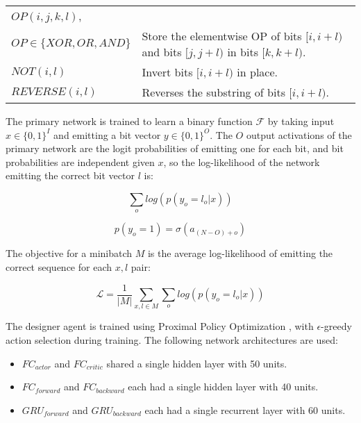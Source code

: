 \documentclass{article}[12px]
\begin{document}
\begin{center}
  \begin{tabular}{| p{4cm} | p{6cm} |}
    \hline
    \(OP(i, j, k, l)\), & \\ \(OP\in\{XOR, OR, AND\}\) & Store the elementwise OP of bits \([i, i + l)\) and bits \([j, j + l)\) in bits \([k, k + l)\). \\
    \(NOT(i, l)\) & Invert bits \([i, i + l)\) in place. \\
    \(REVERSE(i, l)\) & Reverses the substring of bits \([i, i + l)\). \\
    \hline
  \end{tabular}
\end{center}

The primary network is trained to learn a binary function \(\mathcal{F}\) by taking input \(x \in \{0, 1\}^I\) and emitting a bit vector \(y \in \{0, 1\}^O\). The \(O\) output activations of the primary network are the logit probabilities of emitting one for each bit, and bit probabilities are independent given \(x\), so the log-likelihood of the network emitting the correct bit vector \(l\) is:

\begin{equation}
  \sum_o log(p(y_o = l_o | x))
\end{equation}

\begin{equation}
  p(y_o = 1) = \sigma(a_{(N - O) + o})
\end{equation}

The objective for a minibatch \(M\) is the average log-likelihood of emitting the correct sequence for each \(x, l\) pair:

\begin{equation}
  \mathcal{L} = \frac{1}{|M|} \sum_{x, l \in M}\sum_o log(p(y_o = l_o | x))
\end{equation}

The designer agent is trained using Proximal Policy Optimization \cite{DBLP:journals/corr/SchulmanWDRK17}, with \(\epsilon\)-greedy action selection during training. The following network architectures are used:

\begin{itemize}
  \item{\(FC_{actor}\) and \(FC_{critic}\) shared a single hidden layer with 50 units.}
  \item{\(FC_{forward}\) and \(FC_{backward}\) each had a single hidden layer with 40 units.}
  \item{\(GRU_{forward}\) and \(GRU_{backward}\) each had a single recurrent layer with 60 units.}
\end{itemize}
\end{document}
